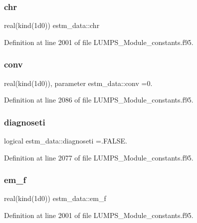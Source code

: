 \subsubsection{\texorpdfstring{chr}{chr}}
{\footnotesize\ttfamily real(kind(1d0)) estm\+\_\+data\+::chr}



Definition at line 2001 of file L\+U\+M\+P\+S\+\_\+\+Module\+\_\+constants.\+f95.

\mbox{\label{namespaceestm__data_adfd1d5673f5f4f967581cab77b4bc1ad}} 
\subsubsection{\texorpdfstring{conv}{conv}}
{\footnotesize\ttfamily real(kind(1d0)), parameter estm\+\_\+data\+::conv =0.}



Definition at line 2086 of file L\+U\+M\+P\+S\+\_\+\+Module\+\_\+constants.\+f95.

\mbox{\label{namespaceestm__data_a38be752511b3e4dcbb87c6152885d83b}} 
\subsubsection{\texorpdfstring{diagnoseti}{diagnoseti}}
{\footnotesize\ttfamily logical estm\+\_\+data\+::diagnoseti =.F\+A\+L\+S\+E.}



Definition at line 2077 of file L\+U\+M\+P\+S\+\_\+\+Module\+\_\+constants.\+f95.

\mbox{\label{namespaceestm__data_ab7d39c4c162023ce9dbe29351fc13f7c}} 
\subsubsection{\texorpdfstring{em\+\_\+f}{em\_f}}
{\footnotesize\ttfamily real(kind(1d0)) estm\+\_\+data\+::em\+\_\+f}



Definition at line 2001 of file L\+U\+M\+P\+S\+\_\+\+Module\+\_\+constants.\+f95.

